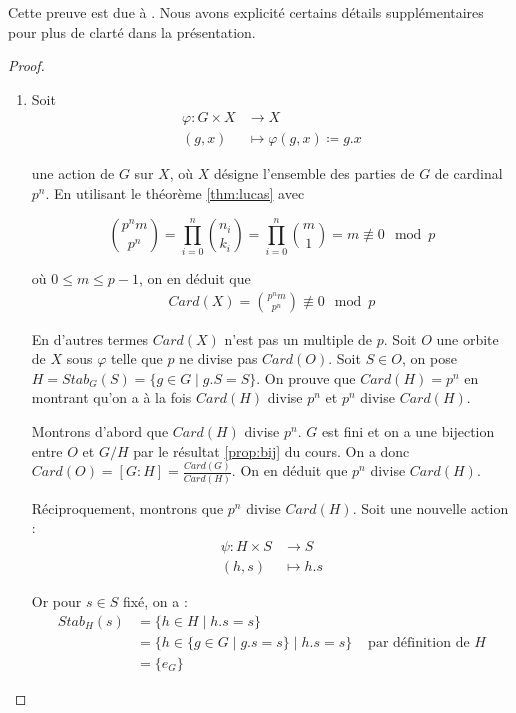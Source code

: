 \documentclass{article}
\theoremstyle{definition}
\theoremstyle{plain}
\theoremstyle{plain}
\theoremstyle{plain}
\theoremstyle{plain}
\theoremstyle{definition}
\theoremstyle{plain}
\theoremstyle{plain}
\begin{document}
Cette preuve est due à \cite[p.~216-218]{chen2024napkin}. Nous avons explicité certains détails supplémentaires pour plus de clarté dans la présentation.
\begin{proof}
	\begin{enumerate}[label={\upshape(\roman*)}]
	\item Soit
\begin{align*}
	\varphi : G \times X &\to X \\
	(g,x) &\mapsto \varphi(g,x) \coloneq g.x
\end{align*}

une action de \( G \) sur \( X \), où \( X \) désigne l'ensemble des parties de \( G \) de cardinal \( p^{n} \). En utilisant le théorème \ref{thm:lucas} avec 

\begin{equation*}
	\binom{p^{n}m}{p^{n}} = \prod_{i=0}^{n} \binom{n_i}{k_i} = \prod_{i=0}^{n} \binom{m}{1} = m \not\equiv 0 \mod p
\end{equation*}

où \( 0 \leq m \leq p-1 \), on en déduit que 
\begin{align*}
	Card(X) = \binom{p^{n}m}{p^{n}} \not\equiv 0 \mod p 
\end{align*}

En d'autres termes \( Card(X) \) n'est pas un multiple de \( p \).
Soit \( O \) une orbite de \( X \) sous \( \varphi \) telle que \( p \) ne divise pas \( Card(O) \). Soit \( S \in O \), on pose \( H = Stab_{G}({S}) = \{ g \in G \mid g.S = S \} \).
On prouve que \( Card(H) = p^{n} \) en montrant qu'on a à la fois \( Card(H) \) divise \( p^{n} \) et \( p^{n} \) divise \(Card(H) \).

\par Montrons d'abord que \( Card(H) \) divise \( p^{n} \). \( G \) est fini et on a une bijection entre \( O \) et \( G/H \) par le résultat \ref{prop:bij} du cours. On a donc \( Card(O) = [G : H]  = \frac{Card(G)}{Card(H)} \). On en déduit que \( p^{n} \) divise \( Card(H) \).

\par Réciproquement, montrons que \( p^{n} \) divise \(Card(H)\). Soit une nouvelle action :
\begin{align*}
	\psi : H \times S &\to S \\
	(h,s) &\mapsto h.s
\end{align*}

Or pour \( s \in S \) fixé, on a :
\begin{align*}
	Stab_{H}({s}) &= \{ h \in H \mid h.s = s \} \\ 
		      &= \{ h \in \{g \in G \mid g.s = s \} \mid h.s = s \} &\text{ par définition de } H\\
	&= \{e_{G}\} 
\end{align*}


\end{enumerate}
\end{proof}
\end{document}
